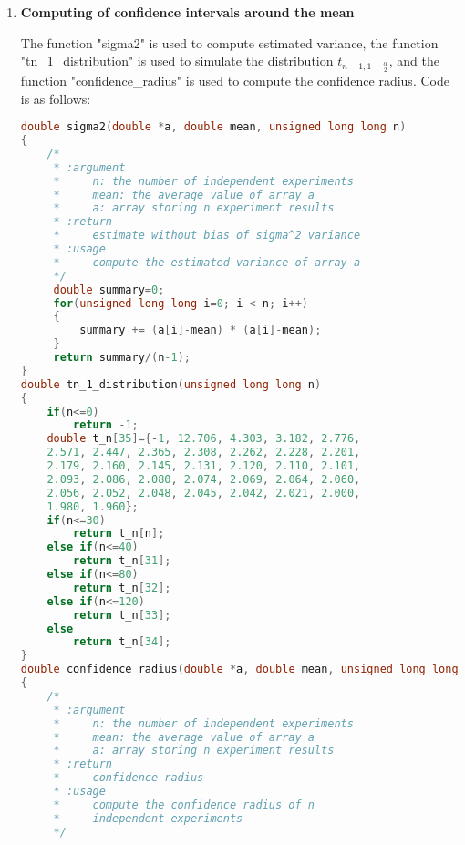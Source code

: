 \documentclass{article}
\begin{document}
\begin{enumerate}
The function defined below is used to get n independent experiment results:
\begin{lstlisting}[language=C]
double *independent_experiments(unsigned long long n, unsigned long long points)
{
    /*
     * :argument 
     *     n: the number of independent experiments
     *     points: the number of points generated.
     * :return
     *     array storing n experiment results
     * :usage
     *     Run MC simulation n times with fixed
     *     points generated.
     */
    double *results = malloc(n * sizeof(double));
    printf("Running %llu independent experiments\n", n);
    for(unsigned long long i=0; i < n; i++)
    {
	results[i] = compute_pi(points);
    }
    return results;
}
\end{lstlisting}
The experiment results is as follows:
\begin{messageshell}
2) n independent experiments
Running 10 independent experiments
Experiment 0: 3.139964
Experiment 1: 3.143592
Experiment 2: 3.140024
Experiment 3: 3.139328
Experiment 4: 3.138552
Experiment 5: 3.142028
Experiment 6: 3.143480
Experiment 7: 3.139464
Experiment 8: 3.141672
Experiment 9: 3.140424
Final result(average): 3.140853
\end{messageshell}
\item{\textbf{Computing of confidence intervals around the mean}}

The function "sigma2" is used to compute estimated variance, the function "tn\_1\_distribution" is used to simulate the distribution $t_{n-1,1-\frac{\alpha}{2}}$, and the function "confidence\_radius" is used to compute the confidence radius. Code is as follows:
\begin{lstlisting}[language=C]
double sigma2(double *a, double mean, unsigned long long n)
{
    /*
     * :argument
     *     n: the number of independent experiments 
     *     mean: the average value of array a
     *     a: array storing n experiment results 
     * :return 
     *     estimate without bias of sigma^2 variance
     * :usage
     *     compute the estimated variance of array a 
     */
     double summary=0;
     for(unsigned long long i=0; i < n; i++)
     {
         summary += (a[i]-mean) * (a[i]-mean);
     }
     return summary/(n-1);
}
double tn_1_distribution(unsigned long long n)
{
    if(n<=0)
        return -1;
    double t_n[35]={-1, 12.706, 4.303, 3.182, 2.776, 
    2.571, 2.447, 2.365, 2.308, 2.262, 2.228, 2.201, 
    2.179, 2.160, 2.145, 2.131, 2.120, 2.110, 2.101, 
    2.093, 2.086, 2.080, 2.074, 2.069, 2.064, 2.060, 
    2.056, 2.052, 2.048, 2.045, 2.042, 2.021, 2.000, 
    1.980, 1.960}; 
    if(n<=30)
        return t_n[n];
    else if(n<=40)
        return t_n[31];
    else if(n<=80)
        return t_n[32];
    else if(n<=120)
        return t_n[33];
    else
        return t_n[34];
}
double confidence_radius(double *a, double mean, unsigned long long n)
{
    /*
     * :argument
     *     n: the number of independent experiments 
     *     mean: the average value of array a
     *     a: array storing n experiment results 
     * :return 
     *     confidence radius
     * :usage
     *     compute the confidence radius of n 
     *     independent experiments 
     */
    

\end{lstlisting}
\end{enumerate}
\end{document}
